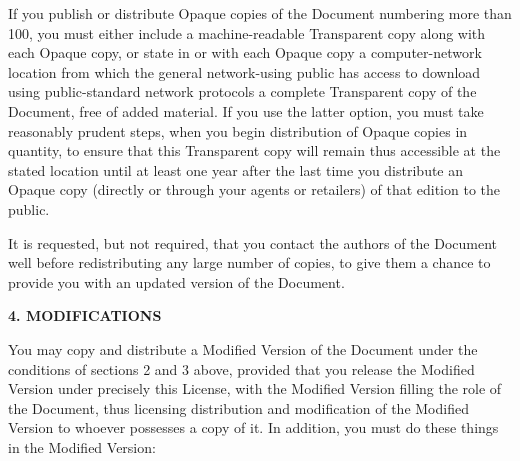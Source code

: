 If you publish or distribute Opaque copies of the Document numbering
more than 100, you must either include a machine-readable Transparent
copy along with each Opaque copy, or state in or with each Opaque copy
a computer-network location from which the general network-using
public has access to download using public-standard network protocols
a complete Transparent copy of the Document, free of added material.
If you use the latter option, you must take reasonably prudent steps,
when you begin distribution of Opaque copies in quantity, to ensure
that this Transparent copy will remain thus accessible at the stated
location until at least one year after the last time you distribute an
Opaque copy (directly or through your agents or retailers) of that
edition to the public.

It is requested, but not required, that you contact the authors of the
Document well before redistributing any large number of copies, to give
them a chance to provide you with an updated version of the Document.


\begin{center}
{\Large\bf 4. MODIFICATIONS}
\end{center}

You may copy and distribute a Modified Version of the Document under
the conditions of sections 2 and 3 above, provided that you release
the Modified Version under precisely this License, with the Modified
Version filling the role of the Document, thus licensing distribution
and modification of the Modified Version to whoever possesses a copy
of it.  In addition, you must do these things in the Modified Version:

